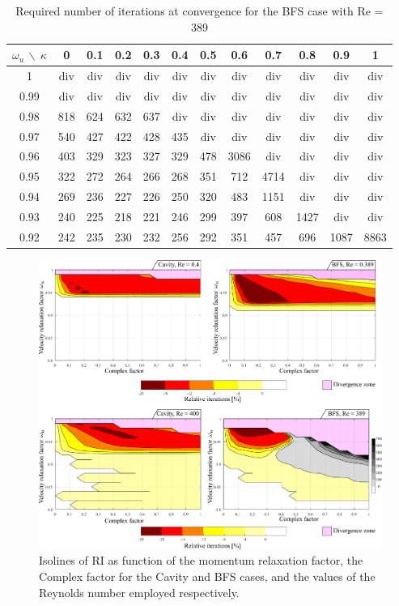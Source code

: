 \documentclass[final,3p,times,11pt,onecolumn]{myElsarticle}
\numberwithin{equation}{section}
\begin{document}
\begin{table}[t!!]
\centering
\begin{tabular}{c|ccccccccccc}
\hline 
$\omega_u\,\backslash\:\kappa$ & 0 & 0.1 & 0.2 & 0.3 & 0.4 & 0.5 & 0.6 & 0.7 & 0.8 & 0.9 & 1 \\ 
\hline 
1 & div & div & div & div & div & div & div & div & div & div & div \\ 
0.99 & div & div & div & div & div & div & div & div & div & div & div \\ 
0.98 & 818 & 624 & 632 & 637 & div & div & div & div & div & div & div \\ 
0.97 & 540 & 427 & 422 & 428 & 435 & div & div & div & div & div & div \\ 
0.96 & 403 & 329 & 323 & 327 & 329 & 478 & 3086 & div & div & div & div \\ 
0.95 & 322 & 272 & 264 & 266 & 268 & 351 & 712 & 4714 & div & div & div \\ 
0.94 & 269 & 236 & 227 & 226 & 250 & 320 & 483 & 1151 & div & div & div \\ 
0.93 & 240 & 225 & 218 & 221 & 246 & 299 & 397 & 608 & 1427 & div & div \\ 
0.92 & 242 & 235 & 230 & 232 & 256 & 292 & 351 & 457 & 696 & 1087 & 8863 \\ 
\hline 
\end{tabular}
\caption{Required number of iterations at convergence for the BFS case with Re = 389}
\label{Table:BFS_HighRe}
\end{table}
\begin{figure}[t!!!!!!!]
\centering
\includegraphics[width=17cm]{fig/Results/FactorLowRe.pdf}
\caption{Isolines of RI as function of the momentum relaxation factor, the Complex factor for the Cavity and BFS cases, and the values of the Reynolds number employed respectively.}
\label{Fig:FactorLowRe}
\end{figure}
\end{document}
